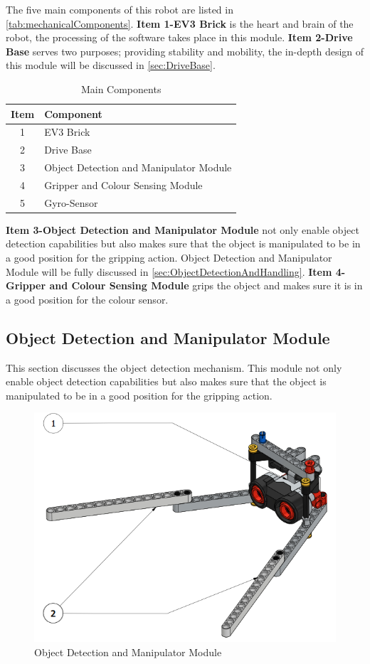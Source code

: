\noindent The five main components of this robot are listed in \vref{tab:mechanicalComponents}. \textbf{Item 1-EV3 Brick} is the heart and brain of the robot, the processing of the software takes place in this module. \textbf{Item 2-Drive Base} serves two purposes; providing stability and mobility, the in-depth design of this module will be discussed in \vref{sec:DriveBase}.

	\begin{table}[!ht]
	\centering
	\caption{Main Components}
	\vspace{-2mm}
	\label{tab:mechanicalComponents}
		\begin{tabular}{cl}
			\hline
			\textbf{Item}&\textbf{Component}\\
			\hline
			1&EV3 Brick\\
			2&Drive Base\\
			3&Object Detection and Manipulator Module\\
			4&Gripper and Colour Sensing Module\\
			5&Gyro-Sensor\\
			\hline			
		\end{tabular}
\end{table}

\noindent \textbf{Item 3-Object Detection and Manipulator Module} not only enable object detection capabilities but also makes sure that the object is manipulated to be in a good position for the gripping action. Object Detection and Manipulator Module will be fully discussed in \vref{sec:ObjectDetectionAndHandling}. \textbf{Item 4-Gripper and Colour Sensing Module} grips the object and makes sure it is in a good position for the colour sensor.
\noindent 
\subsection{Object Detection and Manipulator Module}\label{sec:ObjectDetectionAndHandling}

\noindent This section discusses the object detection mechanism. This module not only enable object detection capabilities but also makes sure that the object is manipulated to be in a good position for the gripping action. 
\begin{figure}[!ht]
	\centering
	\includegraphics[width=0.8\linewidth]{Graphics/ObjectDetection}
	\caption{Object Detection and Manipulator Module}
	\label{fig:objectDetection}
\end{figure}

